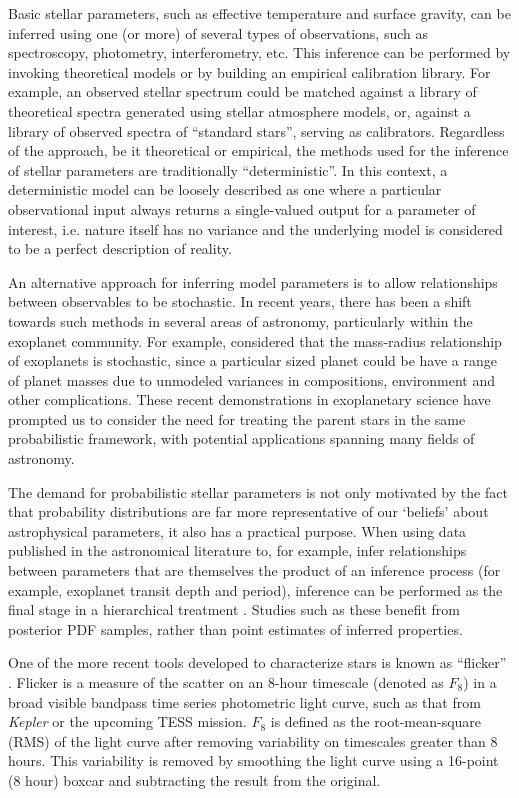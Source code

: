 Basic stellar parameters, such as effective temperature and surface gravity,
can be inferred using one (or more) of several types of observations, such as
spectroscopy, photometry, interferometry, etc. This inference can be performed
by invoking theoretical models or by building an empirical calibration
library.
For example, an observed stellar spectrum could be matched against a library of
theoretical spectra generated using stellar atmosphere models, or, against a
library of observed spectra of ``standard stars'', serving as calibrators.
Regardless of the approach, be it theoretical or empirical, the methods used
for the inference of stellar parameters are traditionally ``deterministic''.
In this context, a deterministic model can be loosely described as one where
a particular observational input always returns a single-valued output for a
parameter of interest, i.e. nature itself has no variance and the underlying
model is considered to be a perfect description of reality.

An alternative approach for inferring model parameters is to allow
relationships between observables to be stochastic.
In recent years, there has been a shift towards such methods in several areas
of astronomy, particularly within the exoplanet community.
For example, \citet{Wolfgang2015} considered that the mass-radius
relationship of exoplanets is stochastic, since a particular sized planet
could be have a range of planet masses due to unmodeled variances in
compositions, environment and other complications.
These recent demonstrations in exoplanetary science have prompted us to
consider the need for treating the parent stars in the same probabilistic
framework, with potential applications spanning many fields of astronomy.

The demand for probabilistic stellar parameters is not only motivated by the
fact that probability distributions are far more representative of our
`beliefs' about astrophysical parameters, it also has a practical purpose.
When using data published in the astronomical literature to, for example,
infer relationships between parameters that are themselves the product of an
inference process (for example, exoplanet transit depth and period), inference
can be performed as the final stage in a hierarchical treatment \citep[see,
e.g.][]{Foreman-Mackey2014}.
Studies such as these benefit from posterior PDF samples, rather than
point estimates of inferred properties.

One of the more recent tools developed to characterize stars is known as
``flicker'' \citep{Bastien2013}.
Flicker is a measure of the scatter on an 8-hour timescale (denoted as $F_8$)
in a broad visible bandpass time series photometric light curve, such as that
from \textit{Kepler} or the upcoming TESS mission.
$F_8$ is defined as the root-mean-square (RMS) of the light curve after
removing variability on timescales greater than 8 hours.
This variability is removed by smoothing the light curve using a 16-point (8
hour) boxcar and subtracting the result from the original.

